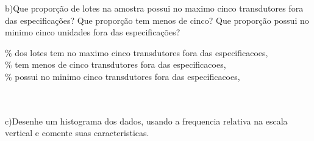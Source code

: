 \documentclass[12pt]{article}%
\begin{document}
 \color[rgb]{0.2,0.2,0.2}
  b)Que proporção de lotes na amostra possui no maximo cinco transdutores fora
 das especificações? Que proporção tem menos de cinco? Que proporção possui
 no minimo cinco unidades fora das especificações?\\
 \color[rgb]{0.6,0.2,0.2}
 
 \pgfmathresult\% dos lotes tem no maximo cinco transdutores fora das especificacoes, \\\pgfmathresult\% tem menos de cinco transdutores fora das especificacoes, \\\pgfmathresult\% possui no minimo cinco transdutores fora das especificacoes, 
 \color[rgb]{0.2,0.2,0.2}
 
\\\\ c)Desenhe um histograma dos dados, usando a frequencia relativa na escala vertical e comente suas caracteristicas.
\end{document}
